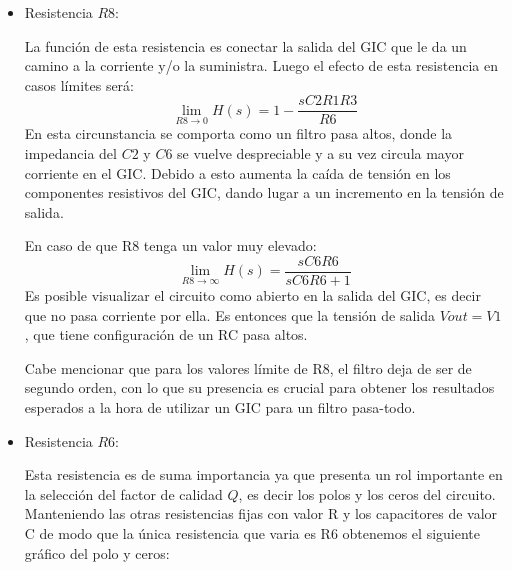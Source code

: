 \begin{itemize}
    \item Resistencia $R8$:
    
    La función de esta resistencia es conectar la salida del GIC que le da un camino a la corriente y/o la suministra. Luego el efecto de esta resistencia en casos límites será:
    $$\lim_{R8 \longrightarrow 0} H(s) = 1 - \frac{sC2R1R3}{R6}$$
    En esta circunstancia se comporta como un filtro pasa altos, donde la impedancia del $C2$ y $C6$ se vuelve despreciable y a su vez  circula mayor corriente en el GIC. Debido a esto aumenta la caída de tensión en los componentes resistivos del GIC, dando lugar a un incremento en la tensión de salida. 
    
    En caso de que R8 tenga un valor muy elevado:
    $$\lim_{R8\longrightarrow\infty} H(s) = \frac{sC6R6}{sC6R6 + 1}$$
    Es posible visualizar el circuito como abierto en la salida del GIC, es decir que no pasa corriente por ella. Es entonces que la tensión de salida $Vout = V1$, que tiene configuración de un RC pasa altos. 
    
    Cabe mencionar que para los valores límite de R8, el filtro deja de ser de segundo orden, con lo que su presencia es crucial para obtener los resultados esperados a la hora de utilizar un GIC para un filtro pasa-todo.
    
    \item Resistencia $R6$:
    
    Esta resistencia es de suma importancia ya que presenta un rol importante en la selección del factor de calidad $Q$, es decir los polos y los ceros del circuito. Manteniendo las otras resistencias fijas con valor R y los capacitores de valor C de modo que la única resistencia que varia es R6 obtenemos el siguiente gráfico del polo y ceros:
    

\end{itemize}
